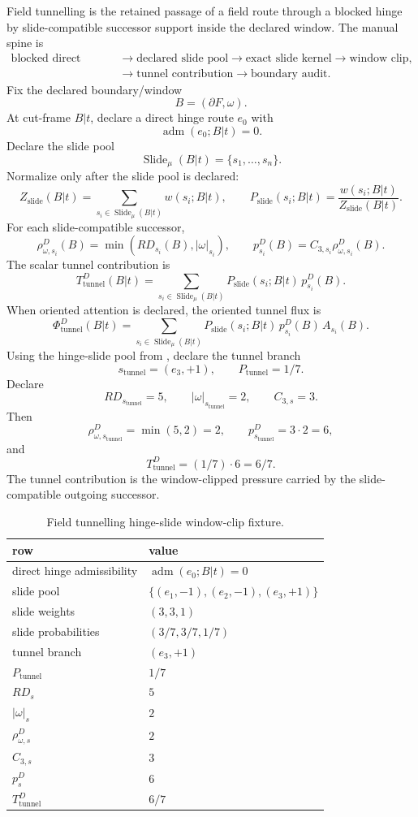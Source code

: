 Field tunnelling is the retained passage of a field route through a blocked hinge by slide-compatible successor support inside the declared window. The manual spine is
\[
\begin{aligned}
\text{blocked direct hinge}
&\to \text{declared slide pool}
\to \text{exact slide kernel}
\to \text{window clip},\\
&\to \text{tunnel contribution}
\to \text{boundary audit}.
\end{aligned}
\]
Fix the declared boundary/window
\[
B=(\partial F,\omega).
\]
At cut-frame \(B|t\), declare a direct hinge route \(e_0\) with
\[
\operatorname{adm}(e_0;B|t)=0.
\]
Declare the slide pool
\[
\operatorname{Slide}_{\mu}(B|t)=\{s_1,\ldots,s_n\}.
\]
Normalize only after the slide pool is declared:
\[
Z_{\mathrm{slide}}(B|t)
=
\sum_{s_i\in\operatorname{Slide}_{\mu}(B|t)}w(s_i;B|t),
\qquad
P_{\mathrm{slide}}(s_i;B|t)
=
\frac{w(s_i;B|t)}{Z_{\mathrm{slide}}(B|t)}.
\]
For each slide-compatible successor,
\[
\rho^D_{\omega,s_i}(B)=\min(RD_{s_i}(B),|\omega|_{s_i}),
\qquad
p^D_{s_i}(B)=C_{3,s_i}\rho^D_{\omega,s_i}(B).
\]
The scalar tunnel contribution is
\[
T^D_{\mathrm{tunnel}}(B|t)
=
\sum_{s_i\in\operatorname{Slide}_{\mu}(B|t)}
P_{\mathrm{slide}}(s_i;B|t)\,p^D_{s_i}(B).
\]
When oriented attention is declared, the oriented tunnel flux is
\[
\Phi^D_{\mathrm{tunnel}}(B|t)
=
\sum_{s_i\in\operatorname{Slide}_{\mu}(B|t)}
P_{\mathrm{slide}}(s_i;B|t)\,p^D_{s_i}(B)\,A_{s_i}(B).
\]
Using the hinge-slide pool from , declare the tunnel branch
\[
s_{\mathrm{tunnel}}=(e_3,+1),
\qquad
P_{\mathrm{tunnel}}=1/7.
\]
Declare
\[
RD_{s_{\mathrm{tunnel}}}=5,
\qquad
|\omega|_{s_{\mathrm{tunnel}}}=2,
\qquad
C_{3,s}=3.
\]
Then
\[
\rho^D_{\omega,s_{\mathrm{tunnel}}}=\min(5,2)=2,
\qquad
p^D_{s_{\mathrm{tunnel}}}=3\cdot2=6,
\]
and
\[
T^D_{\mathrm{tunnel}}=(1/7)\cdot6=6/7.
\]
The tunnel contribution is the window-clipped pressure carried by the slide-compatible outgoing successor.
\begin{table}[H]
\centering
\scriptsize
\caption{Field tunnelling hinge-slide window-clip fixture.}
\begin{tabular}{l l}
\toprule
row & value\\
\midrule
direct hinge admissibility & $\operatorname{adm}(e_0;B|t)=0$\\
slide pool & $\{(e_1,-1),(e_2,-1),(e_3,+1)\}$\\
slide weights & $(3,3,1)$\\
slide probabilities & $(3/7,3/7,1/7)$\\
tunnel branch & $(e_3,+1)$\\
$P_{\mathrm{tunnel}}$ & $1/7$\\
$RD_s$ & $5$\\
$|\omega|_s$ & $2$\\
$\rho^D_{\omega,s}$ & $2$\\
$C_{3,s}$ & $3$\\
$p^D_s$ & $6$\\
$T^D_{\mathrm{tunnel}}$ & $6/7$\\
\bottomrule
\end{tabular}
\label{tab:manual-field-tunnelling-fixture}
\end{table}

